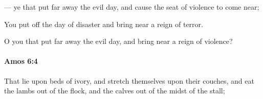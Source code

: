 			\begin{versebox}
					\item[BHS] 
					\item[LXX] 
					\item[ASV] — ye that put far away the evil day, and cause the seat of violence to come near;
					\item[NIV] You put off the day of disaster and bring near a reign of terror.
					\item[NRSV] O you that put far away the evil day, and bring near a reign of violence?
			\end{versebox}

		\paragraph{Amos 6:4} %
			\label{AMOS-6-4}

			That lie upon beds of ivory, and stretch themselves upon their couches, and eat the lambs out of the flock, and the calves out of the midst of the stall;

